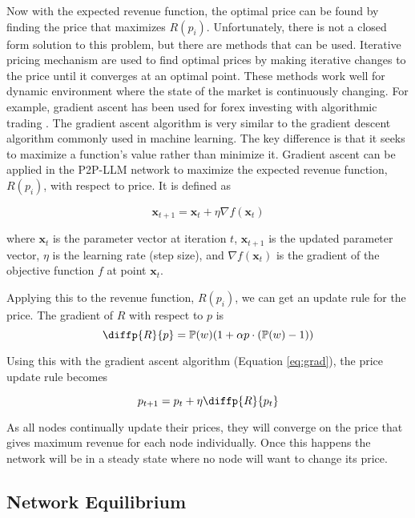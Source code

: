 \documentclass[preprint,twoside,11pt]{article}
\begin{document}
Now with the expected revenue function, the optimal price can be found by finding the price that maximizes $R(p_i)$.
Unfortunately, there is not a closed form solution to this problem, but there are methods that can be used.
Iterative pricing mechanism \citep{ecf80b8b-07bb-374f-ab3f-2cc6a349f689} are used to find optimal prices by making iterative changes to the price until it converges at an optimal point.
These methods work well for dynamic environment where the state of the market is continuously changing.
For example, gradient ascent has been used for forex investing with algorithmic trading \citep{su142215328}.
The gradient ascent algorithm is very similar to the gradient descent algorithm \citep{cauchy1847methode} commonly used in machine learning.
The key difference is that it seeks to maximize a function's value rather than minimize it.
Gradient ascent can be applied in the P2P-LLM network to maximize the expected revenue function, $R(p_i)$, with respect to price.
It is defined as

\begin{equation}
	\mathbf{x}_{t+1} = \mathbf{x}_t + \eta \nabla f(\mathbf{x}_t)
	\label{eq:grad}
\end{equation}

where $\mathbf{x}_t$ is the parameter vector at iteration $t$,
$\mathbf{x}_{t+1}$ is the updated parameter vector,
$\eta$ is the learning rate (step size),
and $\nabla f(\mathbf{x}_t)$ is the gradient of the objective function $f$ at point $\mathbf{x}_t$.

Applying this to the revenue function, $R(p_i)$, we can get an update rule for the price.
The gradient of $R$ with respect to $p$ is
$$\diffp{R}{p} = \mathbb{P}(w)(1 + \alpha p \cdot (\mathbb{P}(w) - 1))$$

Using this with the gradient ascent algorithm (Equation \ref{eq:grad}), the price update rule becomes

\begin{equation}
	p_{t+1} = p_t + \eta \diffp{R}{{p_t}}
	\label{eq:optim_price}
\end{equation}

As all nodes continually update their prices, they will converge on the price that gives
maximum revenue for each node individually. Once this happens the network will be in a steady state where
no node will want to change its price.

\subsection{Network Equilibrium}
\end{document}
